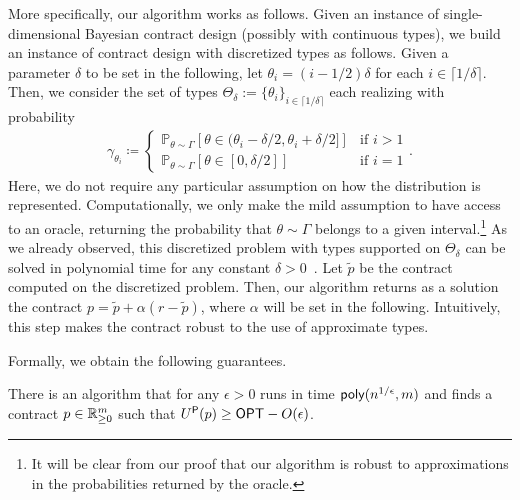 More specifically, our algorithm works as follows. 
Given an instance of single-dimensional Bayesian contract design (possibly with continuous types), we build an instance of contract design with discretized types as follows.
Given a parameter $\delta$ to be set in the following, let $\theta_i=(i-1/2) \delta$ for each $i \in \lceil 1/\delta\rceil$.
Then, we consider the set of types $\Theta_{\delta}:=\{\theta_i\}_{i\in\lceil 1/\delta\rceil}$ each realizing with probability 
\begin{align*}
    \gamma_{\theta_i}\coloneqq \begin{cases}
    \mathbb{P}_{\theta\sim\Gamma}[\theta\in{(\theta_i-\delta/2,\theta_i+\delta/2]}]&\text{if $i>1$}\\
    \mathbb{P}_{\theta\sim\Gamma}[\theta\in{[0,\delta/2]}]&\text{if $i=1$}
    \end{cases}.
\end{align*}
Here, we do not require any particular assumption on how the distribution is represented. Computationally, we only make the mild assumption to have access to an oracle, returning the probability that $\theta\sim \Gamma$ belongs to a given interval.\footnote{It will be clear from our proof that our algorithm is robust to approximations in the probabilities returned by the oracle.}
As we already observed, this discretized problem with types supported on $\Theta_\delta$ can be solved in polynomial time for any constant $\delta>0$~\citep{guruganesh2021contracts, castiglioni2022bayesian}.
Let $\tilde p$ be the contract computed on the discretized problem.
Then, our algorithm returns as a solution the contract $p= \tilde p +\alpha (r-\tilde p)$, where $\alpha$ will be set in the following. Intuitively, this step makes the contract robust to the use of approximate types. 

Formally, we obtain the following guarantees. 
\begin{theorem}\label{thm:PTAS}
    There is an algorithm that for any $\epsilon>0$ runs in time $\textsf{poly}(n^{{1}/{\epsilon}},m)$ and finds a contract $p\in\mathbb{R}^m_{\ge 0}$ such that $U^\textsf{P}(p)\ge \textsf{OPT}-O(\epsilon)$.
\end{theorem}


